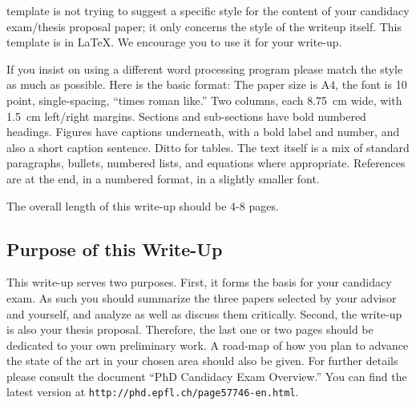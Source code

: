% 
% 
% 
% 
 template is not trying to suggest a specific
style for the content of your candidacy exam/thesis proposal paper; it
only concerns the style of the writeup itself.  This template is in LaTeX.
We encourage you to use it for your write-up.

If you insist on using a different word processing program please
match the style as much as possible.  Here is the basic format: The
paper size is A4, the font is 10 point, 
single-spacing, ``times roman like.''
Two columns, each 8.75~cm wide, with 1.5~cm left/right margins.
Sections and sub-sections have bold numbered headings.  Figures have
captions underneath, with a bold label and number, and also a short
caption sentence.  Ditto for tables.  The text itself is a mix of standard
paragraphs, bullets, numbered lists, and equations where appropriate.
References are at the end, in a numbered format, in a slightly smaller
font.

The overall length of this write-up should be 4-8 pages. 

\subsection{Purpose of this Write-Up}
This write-up serves two purposes. First, it forms the basis for
your candidacy exam. As such you should summarize the three papers selected
by your advisor and yourself, and analyze as well as discuss them critically.
Second, the write-up 
is also your thesis proposal.  Therefore, the last one or two pages should
be dedicated to your own preliminary work. A road-map of how you plan to
advance the state of the art in your chosen area should also be given.
For further details please consult the document ``PhD Candidacy Exam Overview.'' You can find the latest
version at {\tt http://phd.epfl.ch/page57746-en.html}.


